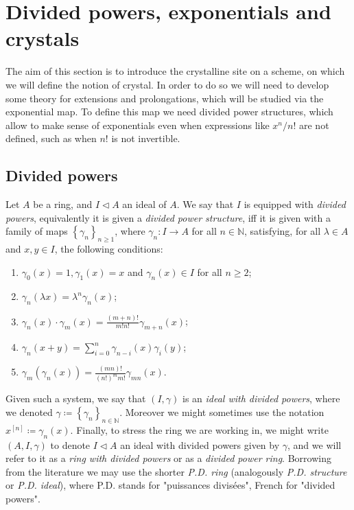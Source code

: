 \section{Divided powers, exponentials and crystals}
The aim of this section is to introduce the crystalline site on a scheme,
on which we will define the notion of crystal.
In order to do so we will need to develop some theory for extensions
and prolongations, which will be studied via the exponential map.
To define this map we need divided power structures,
which allow to make sense of exponentials even when
expressions like $x^n/n!$ are not defined,
such as when \(n!\) is not invertible.



\subsection{Divided powers}
\begin{defn}\label{defn:dividedPowers}
	Let $A$ be a ring, and $I \triangleleft A$ an ideal of $A$.
	We say that $I$ is equipped with \emph{divided powers},
	equivalently it is given a \emph{divided power structure}, iff
	it is given with a family of maps $\left\{ \gamma_n \right\}_{n \geq 1}$,
	where $\gamma_n\colon I \to A$ for all $n \in \mathbb{N}$,
	satisfying, for all $\lambda \in A$ and $x,y \in I$, the following conditions:
	\begin{enumerate}
		\item $\gamma_0(x) = 1, \gamma_1(x) = x$ and 
			$\gamma_n(x) \in I$ for all $n \geq 2$;
		\item $\gamma_n(\lambda x) = \lambda^n \gamma_n(x)$;
		\item $\gamma_n(x) \cdot \gamma_m(x) =
			\frac{\left( m + n \right)!}{m! n!} \gamma_{m+n}(x)$;
		\item $\gamma_n(x+y) = \sum_{i=0}^{n} \gamma_{n-i}(x) \gamma_i(y)$;
		\item $\gamma_m(\gamma_n(x)) = 
			\frac{\left( mn \right)!}{\left( n! \right)^m m!} \gamma_{mn}(x)$.
	\end{enumerate}
	Given such a system, we say that $(I,\gamma)$
	is an \emph{ideal with divided powers},
	where we denoted $\gamma \coloneqq \left\{ \gamma_n \right\}_{n \in \mathbb{N}}$.
	Moreover we might sometimes use the notation
	$x^{[n]} \coloneqq \gamma_n(x)$.
	Finally, to stress the ring we are working in, we might write
	$\left(A, I, \gamma\right)$ to denote $I \triangleleft A$
	an ideal with divided powers given by $\gamma$, and 
	we will refer to it as a \emph{ring with divided powers}
	or as a \emph{divided power ring}.
	Borrowing from the literature we may use the shorter \emph{P.D. ring}
	(analogously \emph{P.D. structure} or \emph{P.D. ideal}), where
	P.D. stands for "puissances divisées", French for "divided powers".
\end{defn}


